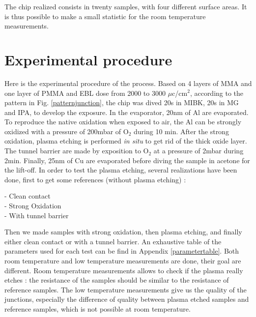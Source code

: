             
            The chip realized consists in twenty samples, with four different surface areas. It is thus possible to make a small statistic for the room temperature measurements.
                        
        \section{Experimental procedure}
        
            Here is the experimental procedure of the process. Based on 4 layers of MMA and one layer of PMMA and EBL dose from 2000 to 3000 $\mu$c/cm$^2$, according to the pattern in Fig. \ref{patternjunction}, the chip was dived 20s in MIBK, 20s in MG and IPA, to develop the exposure. In the evaporator, 20nm of Al are evaporated. To reproduce the native oxidation when exposed to air, the Al can be strongly oxidized with a pressure of 200mbar of O$_2$ during 10 min. After the strong oxidation, plasma etching is performed \textit{in situ} to get rid of the thick oxide layer. The tunnel barrier are made by exposition to O$_2$ at a pressure of 2mbar during 2min. Finally, 25nm of Cu are evaporated before diving the sample in acetone for the lift-off.
            In order to test the plasma etching, several realizations have been done, first to get some references (without plasma etching) :
            
            \indent - Clean contact  \\
            \indent - Strong Oxidation\\
            \indent - With tunnel barrier
                     
            Then we made samples with strong oxidation, then plasma etching, and finally either clean contact or with a tunnel barrier. An exhaustive table of the parameters used for each test can be find in Appendix \ref{parametertable}. Both room temperature and low temperature measurements are done, their goal are different. Room temperature measurements allows to check if the plasma really etches : the resistance of the samples should be similar to the resistance of reference samples. The low temperature measurements give us the quality of the junctions, especially the difference of quality between plasma etched samples and reference samples, which is not possible at room temperature.
            
